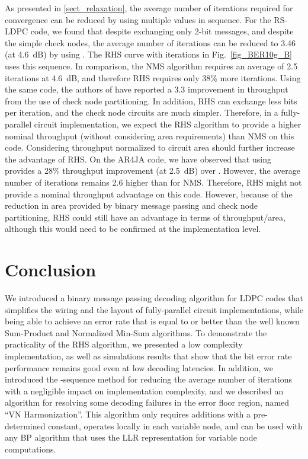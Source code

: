 \documentclass[12pt,journal,twoside,draftcls,onecolumn]{IEEEtran}
\begin{document}
As presented in \ref{sect_relaxation}, the average number of iterations required for convergence can be reduced by using multiple  values in sequence. 
For the RS-LDPC code, we found that despite exchanging only 2-bit messages, and despite the simple check nodes, the average number of iterations can be reduced to 3.46 (at 4.6~dB) by using . The RHS curve with  iterations in Fig.~\ref{fig_BER10g_B} uses this  sequence. In comparison, the NMS algorithm requires an average of 2.5 iterations at 4.6~dB, and therefore RHS requires only 38\% more iterations.
Using the same code, the authors of \cite{mohsenin:2010} have reported a 3.3 improvement in throughput from the use of check node partitioning. In addition, RHS can exchange less bits per iteration, and the check node circuits are much simpler. Therefore, in a fully-parallel circuit implementation, we expect the RHS algorithm to provide a higher nominal throughput (without considering area requirements) than NMS on this code. Considering throughput normalized to circuit area should further increase the advantage of RHS.
On the AR4JA code, we have observed that using  provides a 28\% throughput improvement (at 2.5~dB) over . However, the average number of iterations remains 2.6 higher than for NMS. Therefore, RHS might not provide a nominal throughput advantage on this code. However, because of the reduction in area provided by binary message passing and check node partitioning, RHS could still have an advantage in terms of throughput/area, although this would need to be confirmed at the implementation level.


\section{Conclusion}
\label{sect_conclusion}

We introduced a binary message passing decoding algorithm for LDPC codes that simplifies the wiring and the layout of fully-parallel circuit implementations, while being able to achieve an error rate that is equal to or better than the well known Sum-Product and Normalized Min-Sum algorithms.
To demonstrate the practicality of the RHS algorithm, we presented a low complexity implementation, as well as simulations results that show that the bit error rate performance remains good even at low decoding latencies.
In addition, we introduced the -sequence method for reducing the average number of iterations with a negligible impact on implementation complexity, and we described an algorithm for resolving some decoding failures in the error floor region, named ``VN Harmonization''. This algorithm only requires additions with a pre-determined constant, operates locally in each variable node, and can be used with any BP algorithm that uses the LLR representation for variable node computations.
\end{document}
